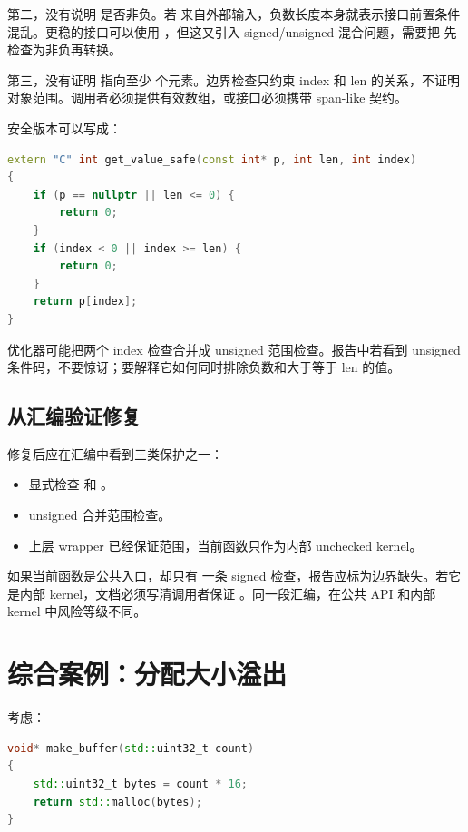 第二，没有说明  是否非负。若  来自外部输入，负数长度本身就表示接口前置条件混乱。更稳的接口可以使用 ，但这又引入 signed/unsigned 混合问题，需要把  先检查为非负再转换。

第三，没有证明  指向至少  个元素。边界检查只约束 index 和 len 的关系，不证明对象范围。调用者必须提供有效数组，或接口必须携带 span-like 契约。

安全版本可以写成：

\begin{lstlisting}[language=C++]
extern "C" int get_value_safe(const int* p, int len, int index)
{
    if (p == nullptr || len <= 0) {
        return 0;
    }
    if (index < 0 || index >= len) {
        return 0;
    }
    return p[index];
}
\end{lstlisting}

优化器可能把两个 index 检查合并成 unsigned 范围检查。报告中若看到 unsigned 条件码，不要惊讶；要解释它如何同时排除负数和大于等于 len 的值。

\subsection{从汇编验证修复}

修复后应在汇编中看到三类保护之一：

\begin{itemize}
  \item 显式检查  和 。
  \item unsigned 合并范围检查。
  \item 上层 wrapper 已经保证范围，当前函数只作为内部 unchecked kernel。
\end{itemize}

如果当前函数是公共入口，却只有  一条 signed 检查，报告应标为边界缺失。若它是内部 kernel，文档必须写清调用者保证 。同一段汇编，在公共 API 和内部 kernel 中风险等级不同。

\section{综合案例：分配大小溢出}

考虑：

\begin{lstlisting}[language=C++]
void* make_buffer(std::uint32_t count)
{
    std::uint32_t bytes = count * 16;
    return std::malloc(bytes);
}
\end{lstlisting}

